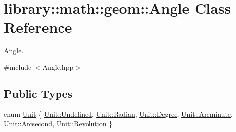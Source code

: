 \hypertarget{classlibrary_1_1math_1_1geom_1_1_angle}{}\section{library\+:\+:math\+:\+:geom\+:\+:Angle Class Reference}
\label{classlibrary_1_1math_1_1geom_1_1_angle}


\hyperlink{classlibrary_1_1math_1_1geom_1_1_angle}{Angle}.  




{\ttfamily \#include $<$Angle.\+hpp$>$}

\subsection*{Public Types}
\begin{DoxyCompactItemize}
\item 
enum \hyperlink{classlibrary_1_1math_1_1geom_1_1_angle_ab593c4dafbb9a5c29fdbe114eaae8eae}{Unit} \{ \newline
\hyperlink{classlibrary_1_1math_1_1geom_1_1_angle_ab593c4dafbb9a5c29fdbe114eaae8eaeaec0fc0100c4fc1ce4eea230c3dc10360}{Unit\+::\+Undefined}, 
\hyperlink{classlibrary_1_1math_1_1geom_1_1_angle_ab593c4dafbb9a5c29fdbe114eaae8eaea50c62e3ca8d8ec8732a7f968a3bf2c7c}{Unit\+::\+Radian}, 
\hyperlink{classlibrary_1_1math_1_1geom_1_1_angle_ab593c4dafbb9a5c29fdbe114eaae8eaea6669c4dc00cb161446821b3529ca07d8}{Unit\+::\+Degree}, 
\hyperlink{classlibrary_1_1math_1_1geom_1_1_angle_ab593c4dafbb9a5c29fdbe114eaae8eaea6d59f6ca1b5de72cbdc10a6792bcf090}{Unit\+::\+Arcminute}, 
\newline
\hyperlink{classlibrary_1_1math_1_1geom_1_1_angle_ab593c4dafbb9a5c29fdbe114eaae8eaea7839ceecae19481f2e21e0ce3e11d3aa}{Unit\+::\+Arcsecond}, 
\hyperlink{classlibrary_1_1math_1_1geom_1_1_angle_ab593c4dafbb9a5c29fdbe114eaae8eaeaad09b2d48b2811c68e5a2bf421f7f2f2}{Unit\+::\+Revolution}
 \}
\end{DoxyCompactItemize}
